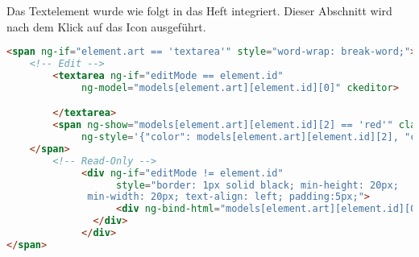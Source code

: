 Das Textelement wurde wie folgt in das Heft integriert. Dieser Abschnitt wird nach dem Klick auf das Icon ausgeführt.
\begin{lstlisting}[caption={Einbindung des Textelements}, language=HTML]
<span ng-if="element.art == 'textarea'" style="word-wrap: break-word;">
	<!-- Edit -->
        <textarea ng-if="editMode == element.id"
             ng-model="models[element.art][element.id][0]" ckeditor>

        </textarea>
        <span ng-show="models[element.art][element.id][2] == 'red'" class="glyphicon glyphicon-exclamation-sign"
             ng-style='{"color": models[element.art][element.id][2], "cursor": "pointer"}'>
	</span>
        <!-- Read-Only -->
             <div ng-if="editMode != element.id"
                   style="border: 1px solid black; min-height: 20px; 
			  min-width: 20px; text-align: left; padding:5px;">
                   <div ng-bind-html="models[element.art][element.id][0]" style="word-wrap: break-word; ">
	           </div>
             </div>
</span>
\end{lstlisting}


